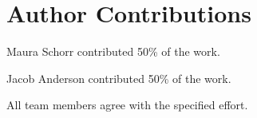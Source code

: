 \section{Author Contributions}

\noindent Maura Schorr contributed 50\% of the work.

\noindent Jacob Anderson contributed 50\% of the work.

\noindent All team members agree with the specified effort.
